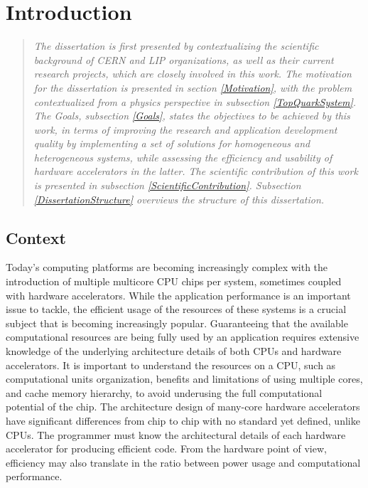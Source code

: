 \chapter{Introduction}
\label{Introduction}

\begin{quote}
\textit{The dissertation is first presented by contextualizing the scientific background of CERN and LIP organizations, as well as their current research projects, which are closely involved in this work. The motivation for the dissertation is presented in section \ref{Motivation}, with the problem contextualized from a physics perspective in subsection \ref{TopQuarkSystem}. The Goals, subsection \ref{Goals}, states the objectives to be achieved by this work, in terms of improving the research and application development quality by implementing a set of solutions for homogeneous and heterogeneous systems, while assessing the efficiency and usability of hardware accelerators in the latter. The scientific contribution of this work is presented in subsection \ref{ScientificContribution}. Subsection \ref{DissertationStructure} overviews the structure of this dissertation.}
\end{quote}

\section{Context}
\label{Context}

Today's computing platforms are becoming increasingly complex with the introduction of multiple multicore CPU chips per system, sometimes coupled with hardware accelerators. While the application performance is an important issue to tackle, the efficient usage of the resources of these systems is a crucial subject that is becoming increasingly popular. Guaranteeing that the available computational resources are being fully used by an application requires extensive knowledge of the underlying architecture details of both CPUs and hardware accelerators. It is important to understand the resources on a CPU, such as computational units organization, benefits and limitations of using multiple cores, and cache memory hierarchy, to avoid underusing the full computational potential of the chip. The architecture design of many-core hardware accelerators have significant differences from chip to chip with no standard yet defined, unlike CPUs. The programmer must know the architectural details of each hardware accelerator for producing efficient code. From the hardware point of view, efficiency may also translate in the ratio between power usage and computational performance.

